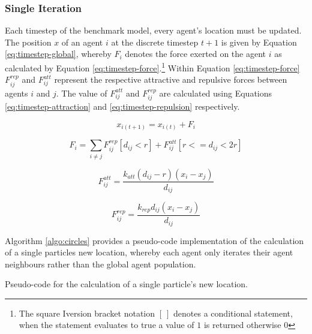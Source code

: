     \subsubsection{Single Iteration}
      Each timestep of the benchmark model, every agent's location must be updated. The position $x$ of an agent $i$ at the discrete timestep $t+1$ is given by Equation \ref{eq:timestep-global}, whereby $F_{i}$ denotes the force exerted on the agent $i$ as calculated by Equation \ref{eq:timestep-force}.\footnote{The square Iversion bracket notation $[\:]$ denotes a conditional statement, when the statement evaluates to true a value of $1$ is returned otherwise $0$} Within Equation \ref{eq:timestep-force} $F_{ij}^{rep}$ and $F_{ij}^{att}$ represent the respective attractive and repulsive forces between agents $i$ and $j$. The value of $F_{ij}^{att}$ and $F_{ij}^{rep}$ are calculated using Equations \ref{eq:timestep-attraction} and \ref{eq:timestep-repulsion} respectively.
      
      \begin{equation}\label{eq:timestep-global}
        x_{i(t+1)} = x_{i(t)} + F_{i}
      \end{equation}
      
      \begin{equation}\label{eq:timestep-force}
        F_{i} = \sum\limits_{i \neq j} F_{ij}^{rep}[d_{ij} < r] + F_{ij}^{att}[r <= d_{ij} < 2r]
      \end{equation}
      
      \begin{equation}\label{eq:timestep-attraction}
        F_{ij}^{att} = \frac{k_{att}(d_{ij}-r)(x_{i} - x_{j})} {d_{ij}}
      \end{equation}  
      
      \begin{equation}\label{eq:timestep-repulsion}
        F_{ij}^{rep} = \frac{k_{rep}d_{ij}(x_{i} - x_{j})} {d_{ij}}
      \end{equation}
      
      Algorithm \ref{algo:circles} provides a pseudo-code implementation of the calculation of a single particles new location, whereby each agent only iterates their agent neighbours rather than the global agent population.
      
\begin{algorithm}

\caption{\label{algo:circles}Pseudo-code for the calculation of a single particle's new location.}
\end{algorithm}

